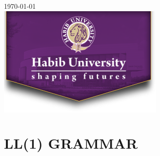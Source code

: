 \documentclass[12pt]{article}
\begin{document}
\begin{titlepage}

{\large \today}\\[2cm] %


\includegraphics{HU_logo_new.png}\\[1cm] %
 

\vfill %

\end{titlepage}



\section*{LL(1) GRAMMAR}
\end{document}
